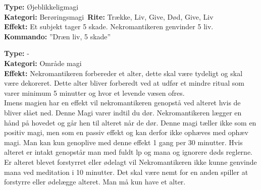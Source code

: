 \begin{død*}
\textbf{Type:} Øjeblikkeligmagi\\
\textbf{Kategori:} Berøringsmagi\
\textbf{Rite:} Trække, Liv, Give, Død, Give, Liv\\
\textbf{Effekt:} Et subjekt tager 5 skade. Nekromantikeren genvinder 5 liv.\\
\textbf{Kommando:} ”Dræn liv, 5 skade”
\end{død*}

\begin{død*}
\textbf{Type:} - \\
\textbf{Kategori:} Område magi\\
\textbf{Effekt:} Nekromantikeren forbereder et alter, dette skal være tydeligt og skal være dekoreret. Dette alter bliver forberedt ved at udfør et mindre ritual som varer minimum 5 minutter og hvor et levende væsen ofres.\\ 
Imens magien har en effekt vil nekromantikeren genopstå  ved alteret hvis de bliver slået ned. Denne Magi varer indtil du dør. Nekromantikeren lægger en hånd på hovedet og går hen til alteret når de dør. Denne magi tæller ikke som en positiv magi, men som en passiv effekt og kan derfor ikke ophæves med ophæv magi.  Man kan kun genoplive med denne effekt 1 gang per 30 minutter. Hvis alteret er intakt genopstår man med fuldt lp og mana og ignorere døds reglerne. Er alteret blevet forstyrret eller ødelagt vil Nekromantikeren ikke kunne genvinde mana ved meditation i 10 minutter. Det skal være nemt for en anden spiller at forstyrre eller ødelægge alteret. Man må kun have et alter.
\end{død*}